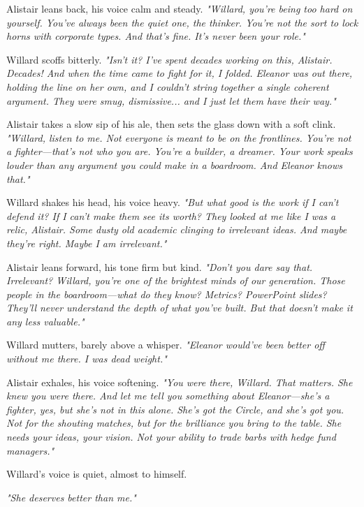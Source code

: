 Alistair leans back, his voice calm and steady.  
\textit{"Willard, you’re being too hard on yourself. You’ve always been the quiet one, the thinker. You’re not the sort to lock horns with corporate types. And that’s fine. It’s never been your role."}
\smallskip

Willard scoffs bitterly.  
\textit{"Isn’t it? I’ve spent decades working on this, Alistair. Decades! And when the time came to fight for it, I folded. Eleanor was out there, holding the line on her own, and I couldn’t string together a single coherent argument. They were smug, dismissive... and I just let them have their way."}
\smallskip

Alistair takes a slow sip of his ale, then sets the glass down with a soft clink.  
\textit{"Willard, listen to me. Not everyone is meant to be on the frontlines. You’re not a fighter—that’s not who you are. You’re a builder, a dreamer. Your work speaks louder than any argument you could make in a boardroom. And Eleanor knows that."}
\smallskip

Willard shakes his head, his voice heavy.  
\textit{"But what good is the work if I can’t defend it? If I can’t make them see its worth? They looked at me like I was a relic, Alistair. Some dusty old academic clinging to irrelevant ideas. And maybe they’re right. Maybe I am irrelevant."}
\smallskip

Alistair leans forward, his tone firm but kind.  
\textit{"Don’t you dare say that. Irrelevant? Willard, you’re one of the brightest minds of our generation. Those people in the boardroom—what do they know? Metrics? PowerPoint slides? They’ll never understand the depth of what you’ve built. But that doesn’t make it any less valuable."}
\smallskip

Willard mutters, barely above a whisper.  
\textit{"Eleanor would’ve been better off without me there. I was dead weight."}
\smallskip

Alistair exhales, his voice softening.  
\textit{"You were there, Willard. That matters. She knew you were there. And let me tell you something about Eleanor—she’s a fighter, yes, but she’s not in this alone. She’s got the Circle, and she’s got you. Not for the shouting matches, but for the brilliance you bring to the table. She needs your ideas, your vision. Not your ability to trade barbs with hedge fund managers."}
\smallskip

Willard’s voice is quiet, almost to himself.  \smallskip

\textit{"She deserves better than me."}
\smallskip

